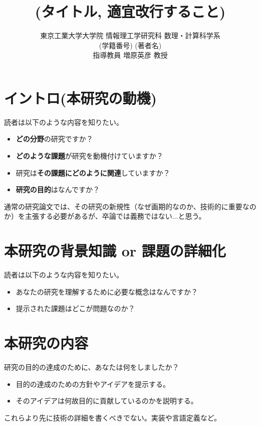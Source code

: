 \documentclass[11pt, a4paper, oneside, twocolumn]{jsarticle}
\title{%
(タイトル, 適宜改行すること)
}
\author{%
東京工業大学大学院 情報理工学研究科 数理・計算科学系\\
(学籍番号) (著者名)\\
指導教員 増原英彦 教授}
\date{}
\begin{document}
\maketitle

\section{イントロ(本研究の動機)}
読者は以下のような内容を知りたい。
\begin{itemize}
\item \textbf{どの分野}の研究ですか？
\item \textbf{どのような課題}が研究を動機付けていますか？
\item 研究は\textbf{その課題にどのように関連}していますか？
\item \textbf{研究の目的}はなんですか？
\end{itemize}
通常の研究論文では、その研究の新規性（なぜ画期的なのか、技術的に重要なのか）を主張する必要があるが、卒論では義務ではない...と思う。

\section{本研究の背景知識 or 課題の詳細化}
読者は以下のような内容を知りたい。
\begin{itemize}
\item あなたの研究を理解するために必要な概念はなんですか？
\item 提示された課題はどこが問題なのか？
\end{itemize}

\section{本研究の内容}
研究の目的の達成のために、あなたは何をしましたか？
\begin{itemize}
\item 目的の達成のための方針やアイデアを提示する。
\item そのアイデアは何故目的に貢献しているのかを説明する。
\end{itemize}
これらより先に技術の詳細を書くべきでない。実装や言語定義など。
\end{document}
